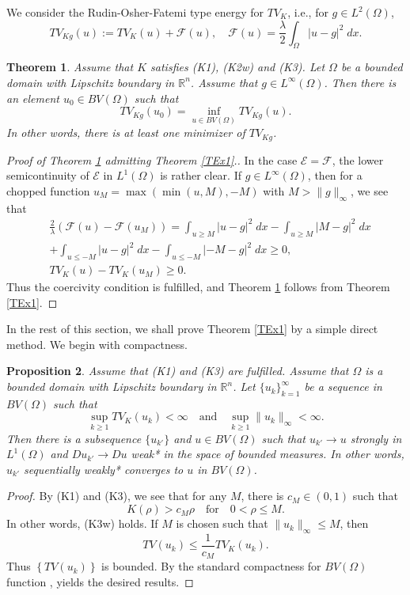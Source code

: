 \documentclass[11pt]{amsart} %
\numberwithin{equation}{section}
\newtheorem{thm}{Theorem}[section]
\newtheorem{prop}[thm]{Proposition}
\begin{document}
We consider the Rudin-Osher-Fatemi type energy for $TV_K$, i.e.,  for $g\in L^2(\Omega)$, 
\[
	TV_{Kg} (u) := TV_K(u) + \mathcal{F}(u), \quad
	\mathcal{F}(u) = \frac{\lambda}{2} \int_\Omega |u-g|^2\; dx.
\]
%
\begin{thm} \label{TEx2}
Assume that $K$ satisfies (K1), (K2w) and (K3).
 Let $\Omega$ be a bounded domain with Lipschitz boundary in $\mathbb{R}^n$.
 Assume that $g\in L^\infty(\Omega)$.
 Then there is an element $u_0\in BV(\Omega)$ such that
\[
	TV_{Kg} (u_0) = \inf_{u\in BV(\Omega)} TV_{Kg}(u).
\]
In other words, there is at least one minimizer of $TV_{Kg}$.
\end{thm}
%
\begin{proof}[Proof of Theorem \ref{TEx2} admitting Theorem \ref{TEx1}.]
In the case $\mathcal{E}=\mathcal{F}$, the lower semicontinuity of $\mathcal{E}$ in $L^1(\Omega)$ is rather clear.
 If $g\in L^\infty(\Omega)$, then for a chopped function  $u_M=\max\left(\min(u,M),-M\right)$ with $M>\lVert g\rVert_\infty$, we see that
\begin{align*}
	&\frac2\lambda \left(\mathcal{F}(u) - \mathcal{F}(u_M) \right)
	= \int_{u\geq M} |u-g|^2\; dx - \int_{u\geq M} |M-g|^2\; dx \\
	&+ \int_{u\leq-M} |u-g|^2\; dx - \int_{u\leq-M} |{-}M-g|^2\; dx \geq 0, \\
	&TV_K(u) - TV_K(u_M) \ge 0.
\end{align*}
Thus the coercivity condition is fulfilled, and  Theorem \ref{TEx2} follows from Theorem \ref{TEx1}.
\end{proof}
%
In the rest of this section, we shall prove Theorem \ref{TEx1} by a simple direct method.
 We begin with compactness.
\begin{prop} \label{PCom}
Assume that (K1) and (K3) are fulfilled.
 Assume that  $\Omega$ is a bounded domain with Lipschitz boundary in $\mathbb{R}^n$.
 Let $\{u_k\}_{k=1}^\infty$ be a sequence in $BV(\Omega)$ such that
\[
	\sup_{k\geq1} TV_K(u_k) < \infty \quad\text{and}\quad
	\sup_{k\geq1} \lVert u_k \rVert_\infty < \infty.
\]
Then there is a subsequence $\{u_{k'}\}$ and $u\in BV(\Omega)$ such that $u_{k'}\to u$ strongly in $L^1(\Omega)$ and $Du_{k'}\to Du$ weak* in the space of bounded measures.
 In other words, $u_{k'}$ sequentially weakly* converges to $u$ in $BV(\Omega)$.
\end{prop}
%
\begin{proof}
By (K1) and (K3), we see that for any $M$, there is $c_M \in(0,1)$ such that
\begin{equation} \label{EKEB}
	K(\rho) > c_M\rho \quad\text{for}\quad
	0 < \rho \leq M.
\end{equation}
In other words, (K3w) holds.
 If $M$ is chosen such that $\lVert u_k \rVert_\infty\leq M$, then
\[
	TV(u_k) \leq \frac{1}{c_M} TV_K(u_k).
\]
Thus $\left\{TV(u_k)\right\}$ is bounded.
 By the standard compactness for $BV(\Omega)$ function \cite[Theorem 3.23]{AFP}, \cite[Theorem 1.19]{Giu} yields the desired results.
\end{proof}
\end{document}
